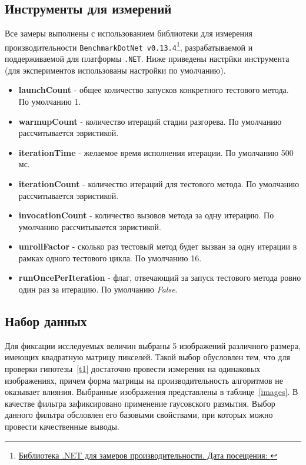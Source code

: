 \subsection{Инструменты для измерений}
\noindent Все замеры выполнены с использованием библиотеки для измерения производительности \texttt{BenchmarkDotNet v0.13.4}\footnote{\href{https://benchmarkdotnet.org/}{Библиотека .NET для замеров производительности. Дата посещения: }}, разрабатываемой и поддерживаемой для платформы \texttt{.NET}. Ниже приведены настрйки инструмента (для экспериментов использованы настройки по умолчанию).
\begin{itemize}[label=--]
    \item{\textbf{launchCount}} - общее количество запусков конкретного тестового метода. По умолчанию 1.
    \item{\textbf{warmupCount}} - количество итераций стадии разгорева. По умолчанию рассчитывается эвристикой.
    \item{\textbf{iterationTime}} - желаемое время исполнения итерации. По умолчанию 500 мс.
    \item{\textbf{iterationCount}} - количество итераций для тестового метода. По умолчанию рассчитывается эвристикой.
    \item{\textbf{invocationCount}} - количество вызовов метода за одну итерацию. По умолчанию рассчитывается эвристикой.
    \item{\textbf{unrollFactor}} - сколько раз тестовый метод будет вызван за одну итерации в рамках одного тестового цикла. По умолчанию 16.
    \item{\textbf{runOncePerIteration}} - флаг, отвечающий за запуск тестового метода ровно один раз за итерацию. По умолчанию \textit{False}.
\end{itemize}



\subsection{Набор данных}
\noindent Для фиксации исследуемых величин выбраны 5 изображений различного размера, имеющих квадратную матрицу пикселей. Такой выбор обусловлен тем, что для проверки гипотезы~\ref{t1} достаточно провести измерения на одинаковых изображениях, причем форма матрицы на производительность алгоритмов не оказывает влияния. Выбранные изображения представлены в таблице~\ref{images}. В качестве фильтра зафиксировано применение гаусовского размытия. Выбор данного фильтра обсловлен его базовыми свойствами, при которых можно провести качественные выводы.

